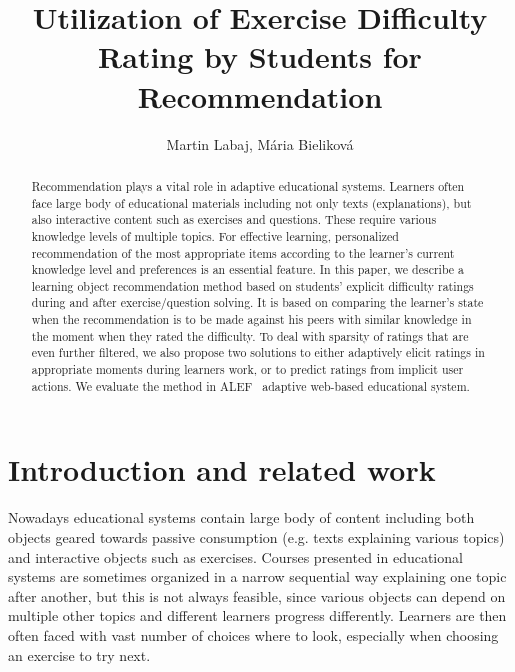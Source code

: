 \documentclass{llncs}
\begin{document}
\sloppy

\title{Utilization of Exercise Difficulty Rating by Students for Recommendation}
\titlerunning{}
\author{Martin Labaj, M\'{a}ria Bielikov\'{a}}
\authorrunning{}

\maketitle

\begin{abstract}
Recommendation plays a vital role in adaptive educational systems. Learners often face large body of educational materials including not only texts (explanations), but also interactive content such as exercises and questions. These require various knowledge levels of multiple topics. For effective learning, personalized recommendation of the most appropriate items according to the learner's current knowledge level and preferences is an essential feature. In this paper, we describe a learning object recommendation method based on students’ explicit difficulty ratings during and after exercise/question solving. It is based on comparing the learner’s state when the recommendation is to be made against his peers with similar knowledge in the moment when they rated the difficulty. To deal with sparsity of ratings that are even further filtered, we also propose two solutions to either adaptively elicit ratings in appropriate moments during learners work, or to predict ratings from implicit user actions. We evaluate the method in ALEF \textendash~adaptive web-based educational system.

\end{abstract}

\section{Introduction and related work}
\label{sec1}

Nowadays educational systems contain large body of content including both objects geared towards passive consumption (e.g. texts explaining various topics) and interactive objects such as exercises. Courses presented in educational systems are sometimes organized in a narrow sequential way explaining one topic after another, but this is not always feasible, since various objects can depend on multiple other topics and different learners progress differently. Learners are then often faced with vast number of choices where to look, especially when choosing an exercise to try next.
\end{document}
